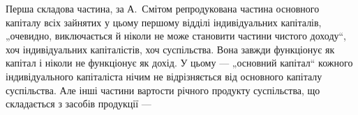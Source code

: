 Перша складова частина, за А.~Смітом репродукована частина основного
капіталу всіх зайнятих у цьому першому відділі індивідуальних
капіталів, „очевидно, виключається й ніколи не може становити частини
чистого доходу“, хоч індивідуальних капіталістів, хоч суспільства. Вона
завжди функціонує як капітал і ніколи не функціонує як дохід. У цьому
— „основний капітал“ кожного індивідуального капіталіста нічим не
відрізняється від основного капіталу суспільства. Але інші частини вартости
річного продукту суспільства, що складається з засобів продукції —
\parbreak{}  %
